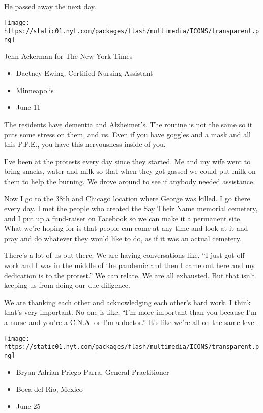 He passed away the next day.

\texttt{[image: https://static01.nyt.com/packages/flash/multimedia/ICONS/transparent.png]}

Jenn Ackerman for The New York Times

\begin{itemize}
\tightlist
\item
  Daetney Ewing, Certified Nursing Assistant
\item
  Minneapolis
\item
  June 11
\end{itemize}

The residents have dementia and Alzheimer's. The routine is not the same
so it puts some stress on them, and us. Even if you have goggles and a
mask and all this P.P.E., you have this nervousness inside of you.

I've been at the protests every day since they started. Me and my wife
went to bring snacks, water and milk so that when they got gassed we
could put milk on them to help the burning. We drove around to see if
anybody needed assistance.

Now I go to the 38th and Chicago location where George was killed. I go
there every day. I met the people who created the Say Their Name
memorial cemetery, and I put up a fund-raiser on Facebook so we can make
it a permanent site. What we're hoping for is that people can come at
any time and look at it and pray and do whatever they would like to do,
as if it was an actual cemetery.

There's a lot of us out there. We are having conversations like, ``I
just got off work and I was in the middle of the pandemic and then I
came out here and my dedication is to the protest.'' We can relate. We
are all exhausted. But that isn't keeping us from doing our due
diligence.

We are thanking each other and acknowledging each other's hard work. I
think that's very important. No one is like, ``I'm more important than
you because I'm a nurse and you're a C.N.A. or I'm a doctor.'' It's like
we're all on the same level.

\texttt{[image: https://static01.nyt.com/packages/flash/multimedia/ICONS/transparent.png]}

\begin{itemize}
\tightlist
\item
  Bryan Adrian Priego Parra, General Practitioner
\item
  Boca del Río, Mexico
\item
  June 25
\end{itemize}

